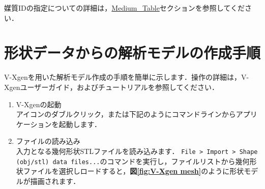 媒質IDの指定についての詳細は，\hyperlink{tgt:medium_table}{Medium\_Table}セクションを参照してください．

\pagebreak
%
\section{形状データからの解析モデルの作成手順}
\label{sec:modeling procedure}
V-Xgenを用いた解析モデル作成の手順を簡単に示します．操作の詳細は，V-Xgenユーザーガイド，およびチュートリアルを参照してください．

\begin{enumerate}
\item V-Xgenの起動\\
アイコンのダブルクリック，または下記のようにコマンドラインからアプリケーションを起動します．

{\small
{}
}

\item ファイルの読み込み\\
入力となる幾何形状STLファイルを読み込みます．
\verb|File > Import > Shape (obj/stl) data files...|のコマンドを実行し，ファイルリストから幾何形状ファイルを選択しロードすると，\textbf{図\ref{fig:V-Xgen mesh}}のように形状モデルが描画されます．\\


\end{enumerate}
